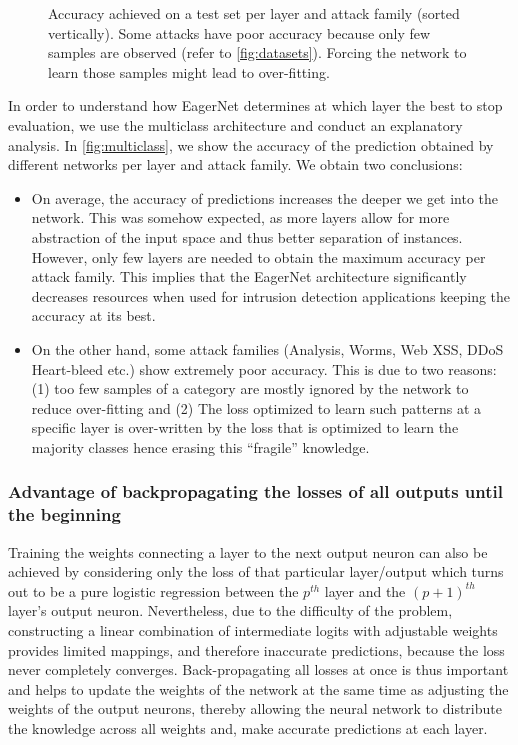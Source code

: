 \documentclass[conference]{IEEEtran}
\newcommand{\mynote}[3]{
    \fbox{\bfseries\sffamily\scriptsize#1}
    {\small$\blacktriangleright$\textsf{\emph{\color{#3}{#2}}}$\blacktriangleleft$}}
\newcommand{\todo}[1]{\mynote{TODO}{#1}{red}}
\begin{document}
\begin{figure}
\begin{tabular}{cccc}
\end{tabular}
\caption{Accuracy achieved on a test set per layer and attack family (sorted vertically). Some attacks have poor accuracy because only few samples are observed (refer to \autoref{fig:datasets}). Forcing the network to learn those samples might lead to over-fitting.}
\label{fig:multiclass}
\end{figure}

In order to understand how EagerNet determines at which layer the best to stop evaluation, we use the multiclass architecture and conduct an explanatory analysis. In \autoref{fig:multiclass}, we show the accuracy of the prediction obtained by different networks per layer and attack family. We obtain two conclusions:
\begin{itemize}
\item  On average, the accuracy of predictions increases the deeper we get into the network. This was somehow expected, as more layers allow for more abstraction of the input space and thus better separation of instances. However, only few layers are needed to obtain the maximum accuracy per attack family. This implies that the EagerNet architecture significantly decreases resources when used for intrusion detection applications keeping the accuracy at its best.
\item  On the other hand, some attack families (Analysis, Worms, Web XSS, DDoS Heart-bleed etc.) show extremely poor accuracy. This is due to two reasons: (1) too few samples of a category are mostly ignored by the network to reduce over-fitting and (2) The loss optimized to learn such patterns at a specific layer is over-written by the loss that is optimized to learn the majority classes hence erasing this ``fragile'' knowledge.
\end{itemize}





\subsubsection{Advantage of backpropagating the losses of all outputs until the beginning}

Training the weights connecting a layer to the next output neuron can also be achieved by considering only the loss of that particular layer/output which turns out to be a pure logistic regression between the $p^{th}$ layer and the $(p+1)^{th}$ layer's output neuron. Nevertheless, due to the difficulty of the problem, constructing a linear combination of intermediate logits with adjustable weights provides limited mappings, and therefore inaccurate predictions, because the loss never completely converges. Back-propagating all losses at once is thus important and helps to update the weights of the network at the same time as adjusting the weights of the output neurons, thereby allowing the neural network to distribute the knowledge across all weights and, make accurate predictions at each layer.
\end{document}
